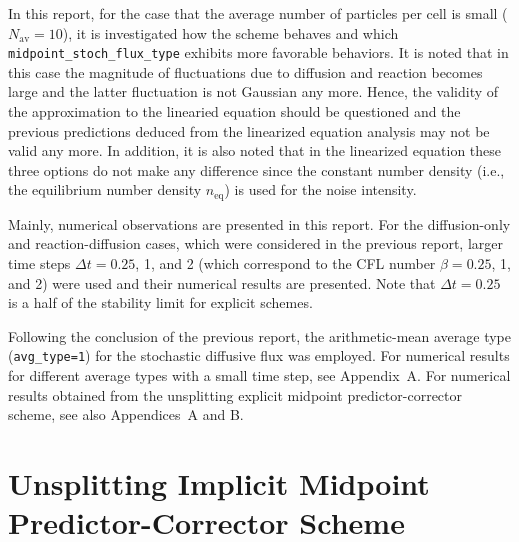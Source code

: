 \documentclass{article}
\begin{document}
In this report, for the case that the average number of particles per cell is small ($N_\mathrm{av}=10$), it is investigated how the scheme behaves and which \texttt{midpoint\_stoch\_flux\_type} exhibits more favorable behaviors. 
It is noted that in this case the magnitude of fluctuations due to diffusion and reaction becomes large and the latter fluctuation is not Gaussian any more.
Hence, the validity of the approximation to the linearied equation should be questioned and the previous predictions deduced from the linearized equation analysis may not be valid any more.
In addition, it is also noted that in the linearized equation these three options do not make any difference since the constant number density (i.e., the equilibrium number density $n_\mathrm{eq}$) is used for the noise intensity.

Mainly, numerical observations are presented in this report.
For the diffusion-only and reaction-diffusion cases, which were considered in the previous report, larger time steps $\Delta t=0.25$, 1, and 2 (which correspond to the CFL number $\beta=0.25$, 1, and 2) were used and their numerical results are presented.
Note that $\Delta t=0.25$ is a half of the stability limit for explicit schemes.

Following the conclusion of the previous report, the arithmetic-mean average type (\texttt{avg\_type=1}) for the stochastic diffusive flux was employed.
For numerical results for different average types with a small time step, see Appendix~A.
For numerical results obtained from the unsplitting explicit midpoint predictor-corrector scheme, see also Appendices~A and B.

\section{\label{sec_implicit_scheme}Unsplitting Implicit Midpoint Predictor-Corrector Scheme}
\end{document}
